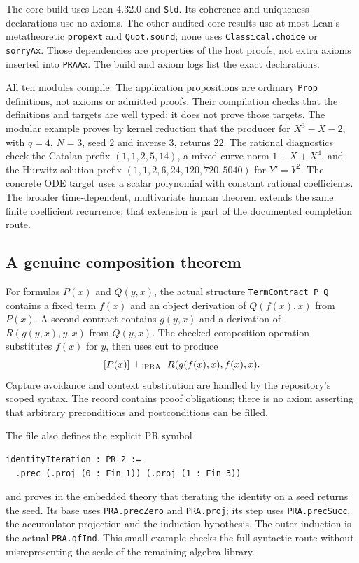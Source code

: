 The core build uses Lean 4.32.0 and \texttt{Std}. Its coherence and
uniqueness declarations use no axioms. The other audited core results
use at most Lean's metatheoretic \texttt{propext} and \texttt{Quot.sound};
none uses \texttt{Classical.choice} or \texttt{sorryAx}. Those dependencies
are properties of the host proofs, not extra axioms inserted into
\texttt{PRAAx}. The build and axiom logs list the exact declarations.

All ten modules compile. The application propositions are ordinary
\texttt{Prop} definitions, not axioms or admitted proofs. Their compilation
checks that the definitions and targets are well typed; it does not prove
those targets. The modular example proves by kernel reduction that the
producer for \(X^3-X-2\), with \(q=4\), \(N=3\), seed \(2\) and inverse
\(3\), returns \(22\). The rational diagnostics check the Catalan prefix
\((1,1,2,5,14)\), a mixed-curve norm \(1+X+X^4\), and the Hurwitz
solution prefix \((1,1,2,6,24,120,720,5040)\) for \(Y'=Y^2\).
The concrete ODE target uses a scalar polynomial with constant rational
coefficients. The broader time-dependent, multivariate human theorem
extends the same finite coefficient recurrence; that extension is part
of the documented completion route.

\subsection{A genuine composition theorem}

For formulas \(P(x)\) and \(Q(y,x)\), the actual structure
\texttt{TermContract P Q} contains a fixed term \(f(x)\) and an object
derivation of \(Q(f(x),x)\) from \(P(x)\). A second contract contains
\(g(y,x)\) and a derivation of \(R(g(y,x),y,x)\) from \(Q(y,x)\).
The checked composition operation substitutes \(f(x)\) for \(y\), then
uses cut to produce
\[
        [P(x)]\ \vdash_{\ipra}\ R(g(f(x),x),f(x),x).
\]
Capture avoidance and context substitution are handled by the repository's
scoped syntax. The record contains proof obligations; there is no axiom
asserting that arbitrary preconditions and postconditions can be filled.

The file also defines the explicit PR symbol
\begin{lstlisting}
identityIteration : PR 2 :=
  .prec (.proj (0 : Fin 1)) (.proj (1 : Fin 3))
\end{lstlisting}
and proves in the embedded theory that iterating the identity on a seed
returns the seed. Its base uses \texttt{PRA.precZero} and
\texttt{PRA.proj}; its step uses \texttt{PRA.precSucc}, the accumulator
projection and the induction hypothesis. The outer induction is the
actual \texttt{PRA.qfInd}. This small example checks the full syntactic
route without misrepresenting the scale of the remaining algebra library.

